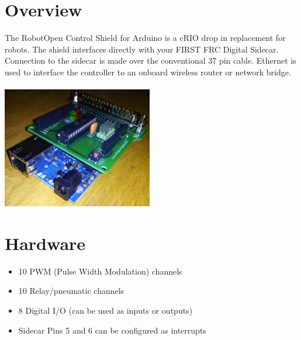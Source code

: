 \documentclass{article}
\begin{document}
\pagestyle{fancy}
\fancyfoot[C]{}
\setlength\headsep{50pt}
\setlength\footskip{15pt}
\begin{multicols}{2}    %


\section*{Overview}
The RobotOpen Control Shield for Arduino is a cRIO drop in replacement for robots. The shield interfaces directly with your FIRST FRC Digital Sidecar. Connection to the sidecar is made over the conventional 37 pin cable. Ethernet is used to interface the controller to an onboard wireless router or network bridge.
\\\\
\includegraphics[width=248px]{side.jpg}

\section*{Hardware}

\begin{itemize}

\item 10 PWM (Pulse Width Modulation) channels

\item 10 Relay/pneumatic channels

\item 8 Digital I/O (can be used as inputs or outputs)

\item Sidecar Pins 5 and 6 can be configured as interrupts


\end{itemize}
\end{multicols}
\end{document}
